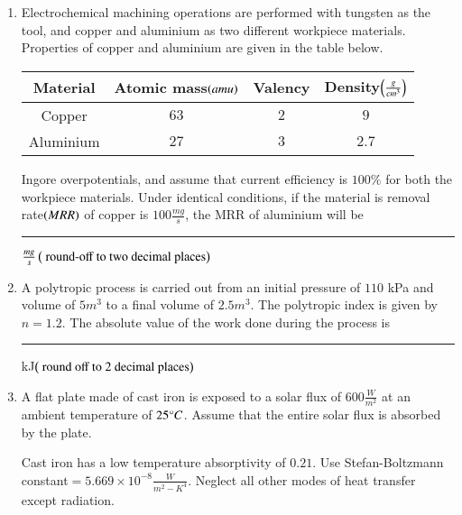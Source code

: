 \documentclass[journal]{IEEEtran}
\begin{document}
\begin{enumerate}
{\begin{figure}[H]
\label{fig:my_label}
\end{figure}
}
\item{
Electrochemical machining operations are performed with tungsten as the tool, and copper and aluminium as two different workpiece materials. Properties of copper and aluminium are given in the table below.
\begin{table}[h!]
    \centering
    \begin{tabular}{|c|c|c|c|}
        \hline
         Material&Atomic mass$\left(amu\right)$&Valency&Density$\left(\frac{g}{cm^3}\right)$  \\
         \hline
         Copper&$63$&$2$&$9$\\
         \hline
         Aluminium&$27$&$3$&$2.7$\\
         \hline
    \end{tabular}
    \label{tab:my_label}
\end{table}
Ingore overpotentials, and assume that current efficiency is $100\%$ for both the workpiece materials. Under identical conditions, if the material is removal rate$\left(MRR\right)$ of copper is $100\frac{mg}{s}$, the MRR of aluminium will be \rule{2cm}{0.15mm}$\frac{mg}{s}\left(\text{ round-off to two decimal places}\right)$\\
}
\item{
A polytropic process is carried out from an initial pressure of $110$ kPa and volume of $5m^3$ to a final volume of $2.5m^3$. The polytropic index is given by $n=1.2$. The absolute value of the work done during the process is \rule{2cm}{0.15mm}kJ$\left(\text{ round off to $2$ decimal places}\right)$\\
}
\item{
A flat plate made of cast iron is exposed to a solar flux of $600\frac{W}{m^2}$ at an ambient temperature of $25\degree C$. Assume that the entire solar flux is absorbed by the plate.

Cast iron has a low temperature absorptivity of $0.21$. Use Stefan-Boltzmann constant$=5.669\times 10^{-8}\frac{W}{m^2-K^4}$. Neglect all other modes of heat transfer except radiation.

}
\end{enumerate}
\end{document}

